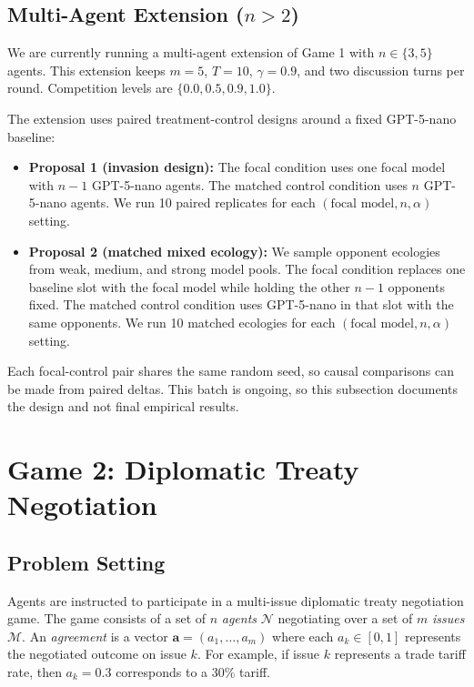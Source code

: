 \subsection{Multi-Agent Extension ($n > 2$)}
\label{sec:game_1_multiagent_setup}

We are currently running a multi-agent extension of Game 1 with $n \in \{3, 5\}$ agents.
This extension keeps $m = 5$, $T = 10$, $\gamma = 0.9$, and two discussion turns per round.
Competition levels are $\{0.0, 0.5, 0.9, 1.0\}$.

The extension uses paired treatment-control designs around a fixed GPT-5-nano baseline:
\begin{itemize}
    \item \textbf{Proposal 1 (invasion design):} The focal condition uses one focal model with $n-1$ GPT-5-nano agents. The matched control condition uses $n$ GPT-5-nano agents. We run 10 paired replicates for each $(\text{focal model}, n, \alpha)$ setting.
    \item \textbf{Proposal 2 (matched mixed ecology):} We sample opponent ecologies from weak, medium, and strong model pools. The focal condition replaces one baseline slot with the focal model while holding the other $n-1$ opponents fixed. The matched control condition uses GPT-5-nano in that slot with the same opponents. We run 10 matched ecologies for each $(\text{focal model}, n, \alpha)$ setting.
\end{itemize}

Each focal-control pair shares the same random seed, so causal comparisons can be made from paired deltas.
This batch is ongoing, so this subsection documents the design and not final empirical results.

\section{Game 2: Diplomatic Treaty Negotiation}

\subsection{Problem Setting}
\label{sec:game_2_problem_setting}

Agents are instructed to participate in a multi-issue diplomatic treaty negotiation game.
The game consists of a set of $n$ \emph{agents} $\mathcal{N}$ negotiating over a set of $m$ \emph{issues} $\mathcal{M}$.
An \emph{agreement} is a vector $\bm{a} = (a_1, \dots, a_m)$ where each $a_k \in [0,1]$ represents the negotiated outcome on issue $k$.
For example, if issue $k$ represents a trade tariff rate, then $a_k = 0.3$ corresponds to a 30\% tariff.

